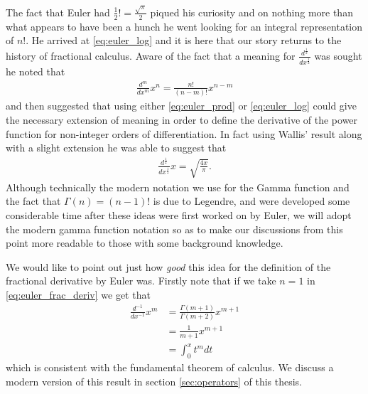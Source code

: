 The fact that Euler had $ \frac{1}{2} ! = \frac{\sqrt{\pi}}{2} $ piqued his curiosity and on nothing more than what appears to have been a hunch he went looking for an integral representation of $ n! $.
He arrived at \eqref{eq:euler_log} and it is here that our story returns to the history of fractional calculus. Aware of the fact that a meaning for $ \frac{d^\frac{1}{2}}{dx^\frac{1}{2}} $ was sought he noted that
\begin{align}
    \label{eq:euler_frac_deriv}
    \frac{d^m}{dx^m} x^n = \frac{n!}{(n-m)!}x^{n-m}
\end{align}
and then suggested that using either \eqref{eq:euler_prod} or \eqref{eq:euler_log} could give the necessary extension of meaning in order to define the derivative of the power function for non-integer orders of differentiation. In fact using Wallis' result along with a slight extension he was able to suggest that
\begin{align}
    \frac{d^\frac{1}{2}}{dx^\frac{1}{2}} x = \sqrt{\frac{4x}{\pi}}.
\end{align}
Although technically the modern notation we use for the Gamma function and the fact that $ \Gamma(n) = (n-1)! $ is due to Legendre, and were developed some considerable time after these ideas were first worked on by Euler, we will adopt the modern gamma function notation so as to make our discussions from this point more readable to those with some background knowledge. 

We would like to point out just how \emph{good} this idea for the definition of the fractional derivative by Euler was.
Firstly note that if we take $ n = 1 $ in \eqref{eq:euler_frac_deriv} we get that
\begin{align}
    \frac{d^{-1}}{dx^{-1}} x^m &= \frac{\Gamma(m+1)}{\Gamma(m+2)} x^{m+1} \\
    &= \frac{1}{m+1} x^{m+1} \\
    &= \int_0^x t^m dt
\end{align} 
which is consistent with the fundamental theorem of calculus. We discuss a modern version of this result in section \ref{sec:operators} of this thesis. 

